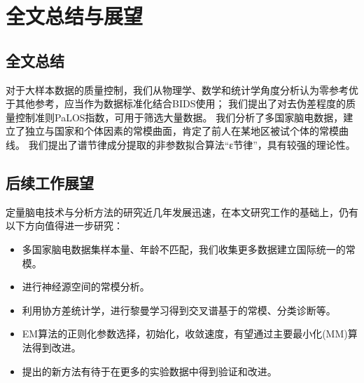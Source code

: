 \chapter{全文总结与展望}
\section{全文总结}
对于大样本数据的质量控制，我们从物理学、数学和统计学角度分析认为零参考优于其他参考，应当作为数据标准化结合BIDS使用；
我们提出了对去伪差程度的质量控制准则PaLOS指数，可用于筛选大量数据。
我们分析了多国家脑电数据，建立了独立与国家和个体因素的常模曲面，肯定了前人在某地区被试个体的常模曲线。
我们提出了谱节律成分提取的非参数拟合算法“ε节律”，具有较强的理论性。

\section{后续工作展望}
定量脑电技术与分析方法的研究近几年发展迅速，在本文研究工作的基础上，仍有以下方向值得进一步研究：
\begin{itemize}
	\item 多国家脑电数据集样本量、年龄不匹配，我们收集更多数据建立国际统一的常模。
	\item 进行神经源空间的常模分析。
	\item 利用协方差统计学，进行黎曼学习得到交叉谱基于的常模、分类诊断等。
	\item EM算法的正则化参数选择，初始化，收敛速度，有望通过主要最小化(MM)算法得到改进。
	\item 提出的新方法有待于在更多的实验数据中得到验证和改进。
\end{itemize}